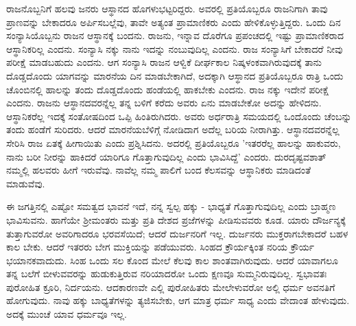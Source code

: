 ರಾಜನೊಬ್ಬನಿಗೆ ಹಲವು ಜನರು ಆಸ್ಥಾನದ ಹೊಗಳುಭಟ್ಟರಿದ್ದರು. ಅವರಲ್ಲಿ ಪ್ರತಿಯೊಬ್ಬರೂ ರಾಜನಿಗಾಗಿ ತಾವು ಪ್ರಾಣವನ್ನು ಬೇಕಾದರೂ ಅರ್ಪಿಸಬಲ್ಲೆವು, ತಾವೇ ಅತ್ಯಂತ ಪ್ರಾಮಾಣಿಕರು ಎಂದು ಹೇಳಿಕೊಳ್ಳುತ್ತಿದ್ದರು. ಒಂದು ದಿನ ಸಂನ್ಯಾಸಿಯೊಬ್ಬನು ರಾಜನ ಆಸ್ಥಾನಕ್ಕೆ ಬಂದನು. ರಾಜನು, ಇನ್ನಾವ ದೊರೆಗೂ ಪ್ರಪಂಚದಲ್ಲಿ ಇಷ್ಟು ಪ್ರಾಮಾಣಿಕರಾದ ಆಸ್ಥಾನಿಕರಿಲ್ಲ ಎಂದನು. ಸಂನ್ಯಾಸಿ ನಕ್ಕು ನಾನು ಇದನ್ನು ನಂಬುವುದಿಲ್ಲ ಎಂದನು. ರಾಜ ಸಂನ್ಯಾಸಿಗೆ ಬೇಕಾದರೆ ನೀವು ಪರೀಕ್ಷೆ ಮಾಡಬಹುದು ಎಂದನು. ಆಗ ಸಂನ್ಯಾಸಿ ರಾಜನ ಆಳ್ವಿಕೆ ದೀರ್ಘಕಾಲ ನಿಷ್ಕಳಂಕವಾಗಿರುವುದಕ್ಕೆ ತಾನು ದೊಡ್ಡದೊಂದು ಯಾಗವನ್ನು ಮಾರನೆಯ ದಿನ ಮಾಡಬೇಕಾಗಿದೆ, ಅದಕ್ಕಾಗಿ ಆಸ್ಥಾನದ ಪ್ರತಿಯೊಬ್ಬರೂ ರಾತ್ರಿ ಒಂದು ಚೊಂಬಿನಲ್ಲಿ ಹಾಲನ್ನು ತಂದು ದೊಡ್ಡದೊಂದು ಹಂಡೆಯಲ್ಲಿ ಹಾಕಬೇಕು ಎಂದನು. ರಾಜ ನಕ್ಕು ಇದೇನೆ ಪರೀಕ್ಷೆ ಎಂದನು. ರಾಜನು ಆಸ್ಥಾನದವರನ್ನೆಲ್ಲ ತನ್ನ ಬಳಿಗೆ ಕರೆದು ಅವರು ಏನು ಮಾಡಬೇಕೋ ಅದನ್ನು ಹೇಳಿದನು. ಆಸ್ಥಾನಿಕರೆಲ್ಲ ಇದಕ್ಕೆ ಸಂತೋಷದಿಂದ ಒಪ್ಪಿ ಹಿಂತಿರುಗಿದರು. ಅವರು ಅರ್ಧರಾತ್ರಿ ಸಮಯದಲ್ಲಿ ಒಂದೊಂದು ಚೆಂಬನ್ನು ತಂದು ಹಂಡೆಗೆ ಸುರಿದರು. ಆದರೆ ಮಾರನೆಯಬೆಳಿಗ್ಗೆ ನೋಡಿದಾಗ ಅದೆಲ್ಲ ಬರಿಯ ನೀರಾಗಿತ್ತು. ಆಸ್ಥಾನದವರನ್ನೆಲ್ಲ ಸೇರಿಸಿ ರಾಜ ಏತಕ್ಕೆ ಹೀಗಾಯಿತು ಎಂದು ಪ್ರಶ್ನಿಸಿದನು. ಅದರಲ್ಲಿ ಪ್ರತಿಯೊಬ್ಬರೂ 'ಇತರರೆಲ್ಲ ಹಾಲನ್ನು ಹಾಕುವರು, ನಾನು ಬರೀ ನೀರನ್ನು ಹಾಕಿದರೆ ಯಾರಿಗೂ ಗೊತ್ತಾಗುವುದಿಲ್ಲ ಎಂದು ಭಾವಿಸಿದ್ದೆ' ಎಂದರು. ದುರದೃಷ್ಟವಶಾತ್ ನಮ್ಮಲ್ಲಿ ಹಲವರು ಹೀಗೆ ಇರುವೆವು. ನಾವೆಲ್ಲ ನಮ್ಮ ಪಾಲಿಗೆ ಬಂದ ಕೆಲಸವನ್ನು ಆಸ್ಥಾನಿಕರು ಮಾಡಿದಂತೆ ಮಾಡುವೆವು.

ಈ ಜಗತ್ತಿನಲ್ಲಿ ಎಷ್ಟೋ ಸಮತ್ವದ ಭಾವನೆ ಇದೆ, ನನ್ನ ಸ್ವಲ್ಪ ಹಕ್ಕು - ಭಾಧ್ಯತೆ ಗೊತ್ತಾಗುವುದಿಲ್ಲ ಎಂದು ಬ್ರಾಹ್ಮಣ ಭಾವಿಸುವನು. ಹಾಗೆಯೇ ಶ‍್ರೀಮಂತರು ಮತ್ತು ಪ್ರತಿ ದೇಶದ ಪ್ರಜೆಗಳನ್ನು ಪೀಡಿಸುವವರು ಕೂಡ. ಯಾರು ದೌರ್ಜನ್ಯಕ್ಕೆ ತುತ್ತಾಗುವರೋ ಅವರಿಗಾದರೂ ಭರವಸೆಯಿದೆ; ಆದರೆ ದುರ್ಜನರಿಗೆ ಇಲ್ಲ. ದುರ್ಜನರು ಮುಕ್ತರಾಗಬೇಕಾದರೆ ಬಹಳ ಕಾಲ ಬೇಕು. ಆದರೆ ಇತರರು ಬೇಗ ಮುಕ್ತಿಯನ್ನು ಪಡೆಯುವರು. ಸಿಂಹದ ಕ್ರೌರ್ಯಕ್ಕಿಂತ ನರಿಯ ಕ್ರೌರ್ಯ ಭಯಾನಕವಾದುದು. ಸಿಂಹ ಒಂದು ಸಲ ಕೊಂದ ಮೇಲೆ ಕೆಲವು ಕಾಲ ಶಾಂತವಾಗಿರುವುದು. ಆದರೆ ಯಾವಾಗಲೂ ತನ್ನ ಬಲೆಗೆ ಬೀಳುವವರನ್ನು ಹುಡುಕುತ್ತಿರುವ ನರಿಯಾದರೋ ಒಂದು ಕ್ಷಣವೂ ಸುಮ್ಮನಿರುವುದಿಲ್ಲ. ಸ್ವಭಾವತಃ ಪುರೋಹಿತ ಕ್ರೂರಿ, ನಿರ್ದಯನು. ಆದಕಾರಣವೇ ಎಲ್ಲಿ ಪುರೋಹಿತರು ಮೇಲೇಳುವರೋ ಅಲ್ಲಿ ಧರ್ಮ ಅವನತಿಗೆ ಹೋಗುವುದು. ನಾವು ಹಕ್ಕು ಬಾಧ್ಯತೆಗಳನ್ನು ತ್ಯಜಿಸಬೇಕು, ಆಗ ಮಾತ್ರ ಧರ್ಮ ಸಾಧ್ಯ ಎಂದು ವೇದಾಂತ ಹೇಳುವುದು. ಅದಕ್ಕೆ ಮುಂಚೆ ಯಾವ ಧರ್ಮವೂ ಇಲ್ಲ.

